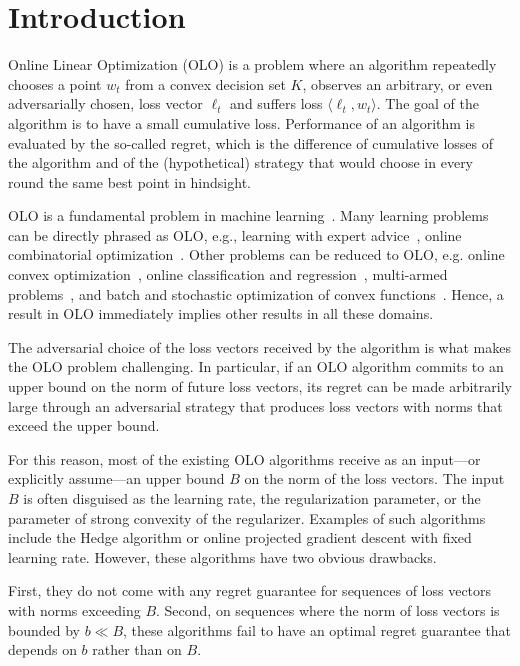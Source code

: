 \section{Introduction}
\label{section:introduction}

Online Linear Optimization (OLO) is a problem where an algorithm repeatedly
chooses a point $w_t$ from a convex decision set $K$, observes an arbitrary, or
even adversarially chosen, loss vector $\ell_t$ and suffers loss $\langle
\ell_t, w_t \rangle$.  The goal of the algorithm is to have a small cumulative
loss. Performance of an algorithm is evaluated by the so-called regret, which
is the difference of cumulative losses of the algorithm and of the
(hypothetical) strategy that would choose in every round the same best point in
hindsight.

OLO is a fundamental problem in machine
learning~\cite{Cesa-Bianchi-Lugosi-2006,Shalev-Shwartz-2011}.  Many learning
problems can be directly phrased as OLO, e.g., learning with expert
advice~\cite{Littlestone-Warmuth-1994,Vovk-1998,Cesa-Bianchi-Haussler-Helmbold-Schapire-Warmuth-1997}, online combinatorial
optimization~\cite{Koolen-Warmuth-Kivinen-2010}. Other
problems can be reduced to OLO, e.g. online convex
optimization~\cite[Chapter~2]{Shalev-Shwartz-2011}, online classification and
regression~\cite[Chapters~11~and~12]{Cesa-Bianchi-Lugosi-2006}, multi-armed
problems~\cite[Chapter~6]{Cesa-Bianchi-Lugosi-2006}, and batch and stochastic
optimization of convex functions~\cite{Nemirovski-Yudin-1983}.  Hence, a result in OLO
immediately implies other results in all these domains.

The adversarial choice of the loss vectors received by the algorithm is what
makes the OLO problem challenging. In particular, if an OLO algorithm commits
to an upper bound on the norm of future loss vectors, its regret can be made
arbitrarily large through an adversarial strategy that produces loss vectors
with norms that exceed the upper bound.

For this reason, most of the existing OLO algorithms receive as an input---or
explicitly assume---an upper bound $B$ on the norm of the loss vectors.  The
input $B$ is often disguised as the learning rate, the regularization
parameter, or the parameter of strong convexity of the regularizer. Examples of
such algorithms include the Hedge algorithm or online projected gradient
descent with fixed learning rate.  However, these algorithms have two obvious
drawbacks.

First, they do not come with any regret guarantee for sequences of loss vectors
with norms exceeding $B$. Second, on sequences where the norm of loss vectors
is bounded by $b \ll B$, these algorithms fail to have an optimal regret
guarantee that depends on $b$ rather than on $B$.

